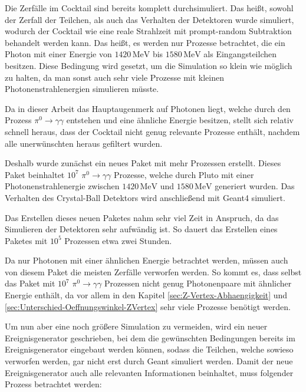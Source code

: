 \documentclass[a4paper,11pt,oneside,final,german,openbib,pdftex]{scrbook}
\begin{document}
{Die Zerf\"alle im Cocktail sind bereits komplett durchsimuliert. Das hei{\ss}t, sowohl der Zerfall der Teilchen, als auch das Verhalten der Detektoren wurde simuliert, wodurch der Cocktail wie eine reale Strahlzeit mit prompt-random Subtraktion behandelt werden kann. Das hei{\ss}t, es werden nur Prozesse betrachtet, die ein Photon mit einer Energie von $1420\,\text{MeV}$ bis $1580\,\text{MeV}$ als Eingangsteilchen besitzen. Diese Bedingung wird gesetzt, um die Simulation so klein wie m\"oglich zu halten, da man sonst auch sehr viele Prozesse mit kleinen Photonenstrahlenergien simulieren m\"usste.

Da in dieser Arbeit das Hauptaugenmerk auf Photonen liegt, welche durch den Prozess $\pi^0 \rightarrow \gamma \gamma$ entstehen und eine \"ahnliche Energie besitzen, stellt sich relativ schnell heraus, dass der Cocktail nicht genug relevante Prozesse enth\"alt, nachdem alle unerw\"unschten heraus gefiltert wurden. 

Deshalb wurde zun\"achst ein neues Paket mit mehr Prozessen erstellt. 
Dieses Paket beinhaltet $10^7$ $\pi^0 \rightarrow \gamma \gamma$ Prozesse, welche durch Pluto mit einer Photonenstrahlenergie zwischen $1420\,\text{MeV}$ und $1580\,\text{MeV}$ generiert wurden. Das Verhalten des Crystal-Ball Detektors wird anschlie{\ss}end mit Geant4 simuliert.

Das Erstellen dieses neuen Paketes nahm sehr viel Zeit in Anspruch, da das Simulieren der Detektoren sehr aufw\"andig ist. So dauert das Erstellen eines Paketes mit $10^5$ Prozessen etwa zwei Stunden. 

Da nur Photonen mit einer \"ahnlichen Energie betrachtet werden, m\"ussen auch von diesem Paket die meisten Zerf\"alle verworfen werden. So kommt es, dass selbst das Paket mit $10^7$ $\pi^0 \rightarrow \gamma \gamma $ Prozessen nicht genug Photonenpaare mit \"ahnlicher Energie enth\"alt, da vor allem in den Kapitel \ref{sec:Z-Vertex-Abhaengigkeit} und \ref{sec:Unterschied-Oeffnungswinkel-ZVertex} sehr viele Prozesse ben\"otigt werden.

Um nun aber eine noch größere Simulation zu vermeiden, wird ein neuer Ereignisgenerator geschrieben, bei dem die gew\"unschten Bedingungen bereits im Ereignisgenerator eingebaut werden k\"onnen, sodass die Teilchen, welche sowieso verworfen werden, gar nicht erst durch Geant simuliert werden. 
Damit der neue Ereignisgenerator auch alle relevanten Informationen beinhaltet, muss folgender Prozess betrachtet werden:

}
\end{document}
